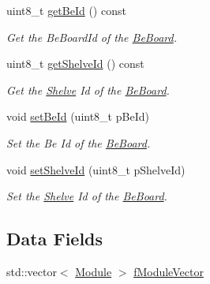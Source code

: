 \begin{CompactItemize}
uint8\_\-t \hyperlink{class_ph2___hw_description_1_1_be_board_2da7431c4861caf9ff6e2667561ac8c5}{get\-Be\-Id} () const 
\begin{CompactList}\small\item\em Get the Be\-Board\-Id of the \hyperlink{class_ph2___hw_description_1_1_be_board}{Be\-Board}. \item\end{CompactList}\item 
uint8\_\-t \hyperlink{class_ph2___hw_description_1_1_be_board_28b9dd9cdcc4fc22f03d36432de37ddf}{get\-Shelve\-Id} () const 
\begin{CompactList}\small\item\em Get the \hyperlink{class_ph2___hw_description_1_1_shelve}{Shelve} Id of the \hyperlink{class_ph2___hw_description_1_1_be_board}{Be\-Board}. \item\end{CompactList}\item 
void \hyperlink{class_ph2___hw_description_1_1_be_board_d96f8aff122cccb9b01a4a57b6db5440}{set\-Be\-Id} (uint8\_\-t p\-Be\-Id)
\begin{CompactList}\small\item\em Set the Be Id of the \hyperlink{class_ph2___hw_description_1_1_be_board}{Be\-Board}. \item\end{CompactList}\item 
void \hyperlink{class_ph2___hw_description_1_1_be_board_cce2ea02abfd36f32a10a900a805f8de}{set\-Shelve\-Id} (uint8\_\-t p\-Shelve\-Id)
\begin{CompactList}\small\item\em Set the \hyperlink{class_ph2___hw_description_1_1_shelve}{Shelve} Id of the \hyperlink{class_ph2___hw_description_1_1_be_board}{Be\-Board}. \item\end{CompactList}\end{CompactItemize}
\subsection*{Data Fields}
\begin{CompactItemize}
\item 
std::vector$<$ \hyperlink{class_ph2___hw_description_1_1_module}{Module} $>$ \hyperlink{class_ph2___hw_description_1_1_be_board_dcee78870a20c92fc8c060ff709a4baf}{f\-Module\-Vector}
\end{CompactItemize}
